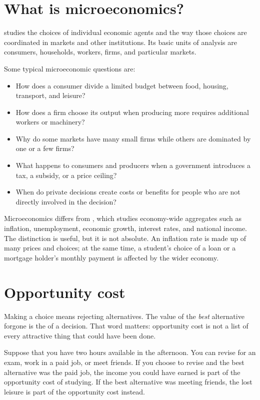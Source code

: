 \section{What is microeconomics?}

 studies the choices of individual economic agents and the way those choices are coordinated in markets and other institutions. Its basic units of analysis are consumers, households, workers, firms, and particular markets.

Some typical microeconomic questions are:

\begin{itemize}
  \item How does a consumer divide a limited budget between food, housing, transport, and leisure?
  \item How does a firm choose its output when producing more requires additional workers or machinery?
  \item Why do some markets have many small firms while others are dominated by one or a few firms?
  \item What happens to consumers and producers when a government introduces a tax, a subsidy, or a price ceiling?
  \item When do private decisions create costs or benefits for people who are not directly involved in the decision?
\end{itemize}

Microeconomics differs from , which studies
economy-wide aggregates such as inflation, unemployment, economic growth,
interest rates, and national income. The distinction is useful, but it is not
absolute. An inflation rate is made up of many prices and choices; at the same
time, a student's choice of a loan or a mortgage holder's monthly payment is
affected by the wider economy.

\section{Opportunity cost}

Making a choice means rejecting alternatives. The value of the \emph{best}
alternative forgone is the  of a decision. That
word matters: opportunity cost is not a list of every attractive thing that
could have been done.

Suppose that you have two hours available in the afternoon. You can revise for an exam, work in a paid job, or meet friends. If you choose to revise and the best alternative was the paid job, the income you could have earned is part of the opportunity cost of studying. If the best alternative was meeting friends, the lost leisure is part of the opportunity cost instead.

